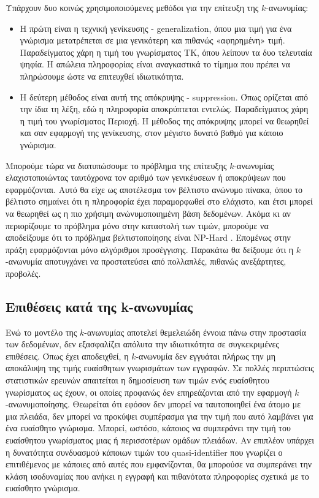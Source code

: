 Υπάρχουν δυο κοινώς χρησιμοποιούμενες μεθόδοι για την επίτευξη της $k$-ανωνυμίας: 
\begin{itemize}

\item Η πρώτη είναι η τεχνική γενίκευσης - \textlatin{generalization}, όπου μια τιμή για ένα γνώρισμα μετατρέπεται σε μια γενικότερη και πιθανώς «αφηρημένη» τιμή. Παραδείγματος χάρη η τιμή του γνωρίσματος ΤΚ, όπου λείπουν τα δυο τελευταία ψηφία. Η απώλεια πληροφορίας είναι αναγκαστικά το τίμημα που πρέπει να πληρώσουμε ώστε να επιτευχθεί ιδιωτικότητα. 

\item Η δεύτερη μέθοδος είναι αυτή της απόκρυψης - \textlatin{suppression}. Όπως ορίζεται από την ίδια τη λέξη, εδώ η πληροφορία αποκρύπτεται εντελώς. Παραδείγματος χάρη η τιμή του γνωρίσματος Περιοχή. Η μέθοδος της απόκρυψης μπορεί να θεωρηθεί και σαν εφαρμογή της γενίκευσης, στον μέγιστο δυνατό βαθμό για κάποιο γνώρισμα. 
\end{itemize}
Μπορούμε τώρα να διατυπώσουμε το πρόβλημα της επίτευξης $k$-ανωνυμίας ελαχιστοποιώντας ταυτόχρονα τον αριθμό των γενικέυσεων ή αποκρύψεων που εφαρμόζονται. Αυτό θα είχε ως αποτέλεσμα τον βέλτιστο ανώνυμο πίνακα, όπου το βέλτιστο σημαίνει ότι η πληροφορία έχει παραμορφωθεί στο ελάχιστο, και έτσι μπορεί να θεωρηθεί ως η πιο χρήσιμη ανώνυμοποιημένη βάση δεδομένων. Ακόμα κι αν περιορίζουμε το πρόβλημα μόνο στην καταστολή των τιμών, μπορούμε να αποδείξουμε ότι το πρόβλημα βελτιστοποίησης είναι \textlatin{NP-Hard \cite{meyerson2004complexity}}. Επομένως στην πράξη εφαρμόζονται μόνο αλγόριθμοι προσέγγισης. Παρακάτω θα δείξουμε ότι η $k$-ανωνυμία αποτυγχάνει να προστατεύσει από πολλαπλές, πιθανώς ανεξάρτητες, προβολές.

\subsection{Επιθέσεις κατά της \textlatin{k}-ανωνυμίας}

Ενώ το μοντέλο της $k$-ανωνυμίας αποτελεί θεμελειώδη έννοια πάνω στην προστασία των δεδομένων, δεν εξασφαλίζει απόλυτα την ιδιωτικότητα σε συγκεκριμένες επιθέσεις. Όπως έχει αποδειχθεί, η $k$-ανωνυμία δεν εγγυάται πλήρως την μη αποκάλυψη της τιμής ευαίσθητων γνωρισμάτων των εγγραφών. Σε πολλές περιπτώσεις στατιστικών ερευνών απαιτείται η δημοσίευση των τιμών ενός ευαίσθητου γνωρίσματος ως έχουν, οι οποίες προφανώς δεν επηρεάζονται από την εφαρμογή $k$-ανωνυμοποίησης. Θεωρείται ότι εφόσον δεν μπορεί να ταυτοποιηθεί ένα άτομο με μια πλειάδα, δεν μπορεί να προκύψει συμπέρασμα για την τιμή που αυτό λαμβάνει για ένα ευαίσθητο γνώρισμα. Μπορεί, ωστόσο, κάποιος να συμπεράνει την τιμή του ευαίσθητου γνωρίσματος μιας ή περισσοτέρων ομάδων πλειάδων. Αν επιπλέον υπάρχει η δυνατότητα συνδυασμού κάποιων τιμών του \textlatin{quasi-identifier} που γνωρίζει ο επιτιθέμενος με κάποιες από αυτές που εμφανίζονται, θα μπορούσε να συμπεράνει την κλάση ισοδυναμίας που ανήκει η εγγραφή και πιθανότατα πληροφορίες σχετικά με το ευαίσθητο γνώρισμα. 

